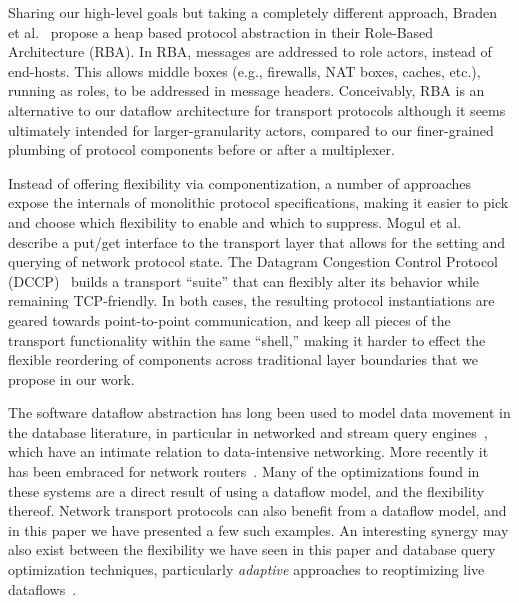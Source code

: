 \documentclass[10pt,twocolumn]{article}
\begin{document}
Sharing our high-level goals but taking a completely different approach,
Braden et al.~\cite{rba} propose a heap based protocol abstraction in
their Role-Based Architecture (RBA). 
In RBA, messages are addressed to role actors, instead of end-hosts. This allows 
middle boxes (e.g., firewalls, NAT boxes, caches, etc.), running as roles, to be addressed 
in message headers. Conceivably, RBA is an alternative to our dataflow
architecture for transport protocols although it seems ultimately
intended for larger-granularity actors, compared to our finer-grained
plumbing of protocol components before or after a multiplexer.
% 
% 

Instead of offering flexibility via componentization, a number of
approaches expose the internals of monolithic protocol specifications,
making it easier to pick and choose which flexibility to enable and
which to suppress. 
Mogul et al.~\cite{unveiling} describe a put/get interface to the transport layer that allows for the setting
and querying of network protocol state.
The Datagram Congestion Control Protocol (DCCP)~\cite{dccp} builds a
transport ``suite'' that can flexibly alter its behavior
while remaining TCP-friendly. In both cases, the resulting protocol
instantiations are geared towards point-to-point communication, and
keep all pieces of the transport functionality within the same
``shell,'' making it harder to effect the flexible reordering of
components across traditional layer boundaries that we
propose in our work.

The software dataflow abstraction has long been used to model data
movement in the database literature, in particular in
networked and stream query engines~\cite{telegraphcq,aurora}, which
have an intimate relation to data-intensive networking.  More recently
it has been embraced for network
routers~\cite{click-tocs,handley05xorp}.  Many of the 
optimizations found in these systems are a direct result of using a
dataflow model, and the flexibility thereof.  Network
transport protocols can also benefit from a dataflow model, and in
this paper we have presented a few such examples.  An interesting
synergy may also exist between the flexibility we have seen in this paper
and database query optimization techniques, particularly {\em
  adaptive} approaches to reoptimizing live
dataflows~\cite{telegraphcq,babu-cidr05}.
\end{document}
